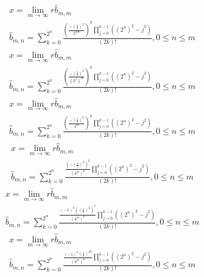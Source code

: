 \documentclass[a4paper,12pt]{report}
\begin{document}
\begin{subequations}
\begin{gather}
x = \lim \limits_{m \to \infty} r \hat{b}_{m,m} \\
\hat{b}_{m,n} = \sum \limits_{k=0}^{2^n} \frac{\left(\frac{-\left(\frac{s}{r}\right)^2}{2^{2m}}\right)^k \prod \limits_{j=0}^{k-1} ((2^n)^2 - j^2)}{(2k)!}, 0 \leq n \leq m
\end{gather}
\end{subequations}
\begin{subequations}
\begin{gather}
x = \lim \limits_{m \to \infty} r \hat{b}_{m,m} \\
\hat{b}_{m,n} = \sum \limits_{k=0}^{2^n} \frac{\left(\frac{-\left(\frac{s}{r}\right)^2}{(2^2)^m}\right)^k \prod \limits_{j=0}^{k-1} ((2^n)^2 - j^2)}{(2k)!}, 0 \leq n \leq m
\end{gather}
\end{subequations}
\begin{subequations}
\begin{gather}
x = \lim \limits_{m \to \infty} r \hat{b}_{m,m} \\
\hat{b}_{m,n} = \sum \limits_{k=0}^{2^n} \frac{\left(\frac{-\left(\frac{s}{r}\right)^2}{4^m}\right)^k \prod \limits_{j=0}^{k-1} ((2^n)^2 - j^2)}{(2k)!}, 0 \leq n \leq m
\end{gather}
\end{subequations}
\begin{subequations}
\begin{gather}
x = \lim \limits_{m \to \infty} r \hat{b}_{m,m} \\
\hat{b}_{m,n} = \sum \limits_{k=0}^{2^n} \frac{\frac{\left(-\left(\frac{s}{r}\right)^2\right)^k}{(4^m)^k} \prod \limits_{j=0}^{k-1} ((2^n)^2 - j^2)}{(2k)!}, 0 \leq n \leq m
\end{gather}
\end{subequations}
\begin{subequations}
\begin{gather}
x = \lim \limits_{m \to \infty} r \hat{b}_{m,m} \\
\hat{b}_{m,n} = \sum \limits_{k=0}^{2^n} \frac{\frac{(-1)^k \left(\left(\frac{s}{r}\right)^2\right)^k}{(4^m)^k} \prod \limits_{j=0}^{k-1} ((2^n)^2 - j^2)}{(2k)!}, 0 \leq n \leq m
\end{gather}
\end{subequations}
\begin{subequations}
\begin{gather}
x = \lim \limits_{m \to \infty} r \hat{b}_{m,m} \\
\hat{b}_{m,n} = \sum \limits_{k=0}^{2^n} \frac{\frac{(-1)^k \left(\frac{s}{r}\right)^{2k}}{(4^m)^k} \prod \limits_{j=0}^{k-1} ((2^n)^2 - j^2)}{(2k)!}, 0 \leq n \leq m
\end{gather}
\end{subequations}
\end{document}
